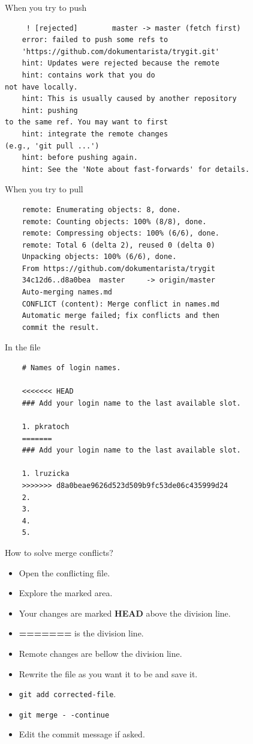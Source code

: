 \documentclass[14pt]{beamer}
\begin{document}
	\begin{frame}[fragile]{When you try to push}
	\begin{verbatim}
	 ! [rejected]        master -> master (fetch first)
	error: failed to push some refs to 
	'https://github.com/dokumentarista/trygit.git'
	hint: Updates were rejected because the remote 
	hint: contains work that you do
not have locally. 
	hint: This is usually caused by another repository 
	hint: pushing
to the same ref. You may want to first 
	hint: integrate the remote changes
(e.g., 'git pull ...')
	hint: before pushing again.
	hint: See the 'Note about fast-forwards' for details.
	\end{verbatim}
	\end{frame}

	\begin{frame}[fragile]{When you try to pull}
	\begin{verbatim}
	remote: Enumerating objects: 8, done.
	remote: Counting objects: 100% (8/8), done.
	remote: Compressing objects: 100% (6/6), done.
	remote: Total 6 (delta 2), reused 0 (delta 0) 
	Unpacking objects: 100% (6/6), done.
	From https://github.com/dokumentarista/trygit
	34c12d6..d8a0bea  master     -> origin/master
	Auto-merging names.md
	CONFLICT (content): Merge conflict in names.md
	Automatic merge failed; fix conflicts and then 
	commit the result.
	\end{verbatim}
\end{frame}

	\begin{frame}[fragile]{In the file}
	\begin{verbatim}
	# Names of login names.
	
	<<<<<<< HEAD                                                                                                           
	### Add your login name to the last available slot.
	
	1. pkratoch
	=======
	### Add your login name to the last available slot.
	
	1. lruzicka
	>>>>>>> d8a0beae9626d523d509b9fc53de06c435999d24
	2.
	3.
	4.
	5.
	\end{verbatim}
	\end{frame}

\begin{frame}{How to solve merge conflicts?}
	\begin{itemize}
		\item Open the conflicting file.
		\item Explore the marked area.
		\item Your changes are marked \textbf{HEAD} above the division line.
		\item \textbf{=======} is the division line.
		\item Remote changes are bellow the division line.
		\item Rewrite the file as you want it to be and save it.
		\item \texttt{git add corrected-file}.
		\item \texttt{git merge -\,-continue}
		\item Edit the commit message if asked.
	\end{itemize}
\end{frame}
\end{document}
